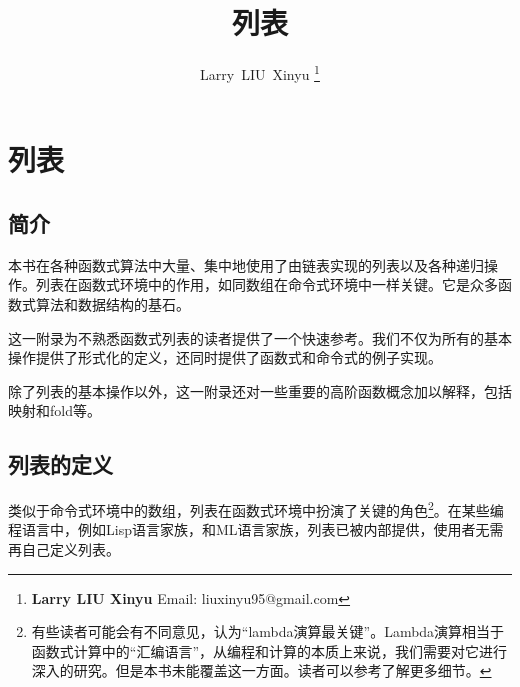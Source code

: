 \documentclass[UTF8]{article}
\begin{document}


\title{列表}

\author{Larry~LIU~Xinyu
\thanks{{\bfseries Larry LIU Xinyu } \newline
  Email: liuxinyu95@gmail.com \newline}
  }

\maketitle
\fi


\ifx\wholebook\relax
\chapter{列表}
\fi

\section{简介}
\label{introduction}

本书在各种函数式算法中大量、集中地使用了由链表实现的列表以及各种递归操作。列表在函数式环境中的作用，如同数组在命令式环境中一样关键。它是众多函数式算法和数据结构的基石。

这一附录为不熟悉函数式列表的读者提供了一个快速参考。我们不仅为所有的基本操作提供了形式化的定义，还同时提供了函数式和命令式的例子实现。

除了列表的基本操作以外，这一附录还对一些重要的高阶函数概念加以解释，包括映射和fold等。


\section{列表的定义}

类似于命令式环境中的数组，列表在函数式环境中扮演了关键的角色\footnote{有些读者可能会有不同意见，认为“lambda演算最关键”。Lambda演算相当于函数式计算中的“汇编语言”，从编程和计算的本质上来说，我们需要对它进行深入的研究。但是本书未能覆盖这一方面。读者可以参考\cite{mittype}了解更多细节。}。在某些编程语言中，例如Lisp语言家族，和ML语言家族，列表已被内部提供，使用者无需再自己定义列表。
\end{document}
